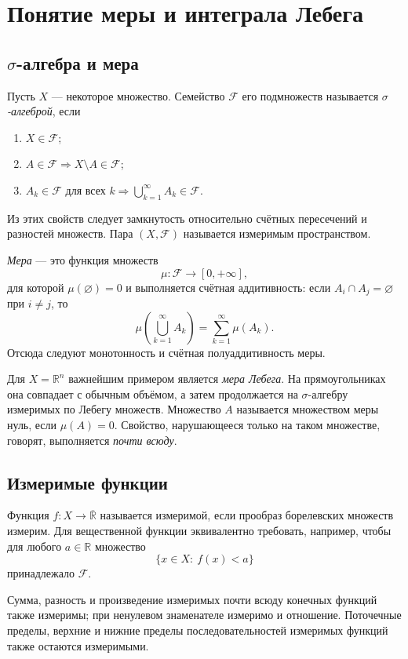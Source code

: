 \section{Понятие меры и интеграла Лебега}
\label{sec:measure-lebesgue-integral}

\subsection{$\sigma$-алгебра и мера}

Пусть $X$ --- некоторое множество. Семейство $\mathcal F$ его подмножеств
называется \emph{$\sigma$-алгеброй}, если
\begin{enumerate}
    \item $X\in\mathcal F$;
    \item $A\in\mathcal F\Rightarrow X\setminus A\in\mathcal F$;
    \item $A_k\in\mathcal F$ для всех $k\Rightarrow
          \displaystyle\bigcup_{k=1}^{\infty}A_k\in\mathcal F$.
\end{enumerate}
Из этих свойств следует замкнутость относительно счётных пересечений и
разностей множеств. Пара $(X,\mathcal F)$ называется измеримым пространством.

\emph{Мера} --- это функция множеств
\[
    \mu:\mathcal F\to[0,+\infty],
\]
для которой $\mu(\varnothing)=0$ и выполняется счётная аддитивность: если
$A_i\cap A_j=\varnothing$ при $i\neq j$, то
\[
    \mu\!\left(\bigcup_{k=1}^{\infty}A_k\right)
    =\sum_{k=1}^{\infty}\mu(A_k).
\]
Отсюда следуют монотонность и счётная полуаддитивность меры.

Для $X=\mathbb R^n$ важнейшим примером является \emph{мера Лебега}. На
прямоугольниках она совпадает с обычным объёмом, а затем продолжается на
$\sigma$-алгебру измеримых по Лебегу множеств. Множество $A$ называется
множеством меры нуль, если $\mu(A)=0$. Свойство, нарушающееся только на таком
множестве, говорят, выполняется \emph{почти всюду}.

\subsection{Измеримые функции}

Функция $f:X\to\overline{\mathbb R}$ называется измеримой, если прообраз
борелевских множеств измерим. Для вещественной функции эквивалентно требовать,
например, чтобы для любого $a\in\mathbb R$ множество
\[
    \{x\in X:\ f(x)<a\}
\]
принадлежало $\mathcal F$.

Сумма, разность и произведение измеримых почти всюду конечных функций также
измеримы; при ненулевом знаменателе измеримо и отношение. Поточечные пределы,
верхние и нижние пределы последовательностей измеримых функций также остаются
измеримыми.

